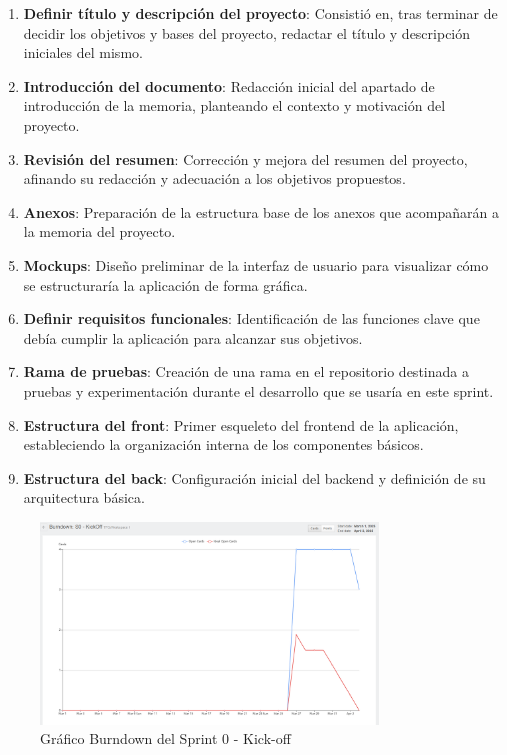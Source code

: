 \begin{enumerate}
\item \textbf{Definir título y descripción del proyecto}: Consistió en, tras terminar de decidir los objetivos y bases del proyecto, redactar el título y descripción iniciales del mismo.
\item \textbf{Introducción del documento}: Redacción inicial del apartado de introducción de la memoria, planteando el contexto y motivación del proyecto.
\item \textbf{Revisión del resumen}: Corrección y mejora del resumen del proyecto, afinando su redacción y adecuación a los objetivos propuestos.
\item \textbf{Anexos}: Preparación de la estructura base de los anexos que acompañarán a la memoria del proyecto.
\item \textbf{Mockups}: Diseño preliminar de la interfaz de usuario para visualizar cómo se estructuraría la aplicación de forma gráfica.
\item \textbf{Definir requisitos funcionales}: Identificación de las funciones clave que debía cumplir la aplicación para alcanzar sus objetivos.
\item \textbf{Rama de pruebas}: Creación de una rama en el repositorio destinada a pruebas y experimentación durante el desarrollo que se usaría en este sprint.
\item \textbf{Estructura del front}: Primer esqueleto del frontend de la aplicación, estableciendo la organización interna de los componentes básicos.
\item \textbf{Estructura del back}: Configuración inicial del backend y definición de su arquitectura básica.
\end{enumerate}

\begin{figure}[H]
\centering
\includegraphics[width=0.8\textwidth]{img/BurndownS0.png}
\caption{Gráfico Burndown del Sprint 0 - Kick-off}
\label{fig:BurndownS0}
\end{figure}

